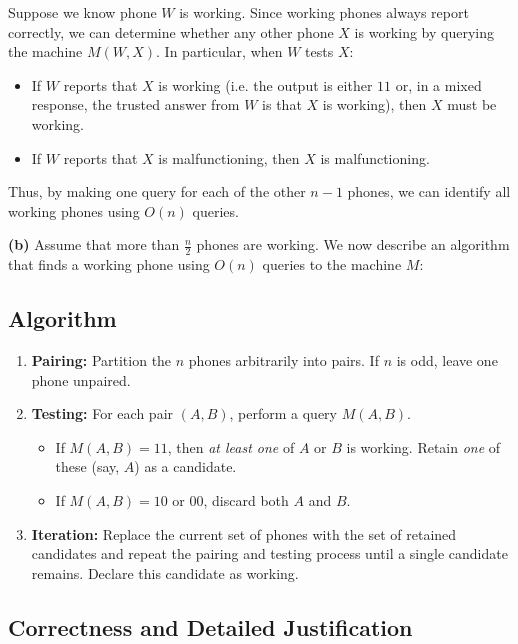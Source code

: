 \documentclass[11pt]{article}
\begin{document}
    Suppose we know  phone \(W\) is working. Since working phones always report correctly, we can determine whether any other phone \(X\) is working by querying the machine \(M(W,X)\). In particular, when \(W\) tests \(X\):
    \begin{itemize}
        \item If \(W\) reports that \(X\) is working (i.e. the output is either \(11\) or, in a mixed response, the trusted answer from \(W\) is that \(X\) is working), then \(X\) must be working.
        \item If \(W\) reports that \(X\) is malfunctioning, then \(X\) is malfunctioning.
    \end{itemize}
    Thus, by making one query for each of the other \(n-1\) phones, we can identify all working phones using \(O(n)\) queries.
    
    \bigskip
    
    \textbf{(b) }
    Assume that more than $\frac{n}{2}$ phones are working. We now describe an algorithm that finds a working phone using $O(n)$ queries to the machine $M$:
    \subsection*{Algorithm}
    \begin{enumerate}
        \item \textbf{Pairing:} Partition the $n$ phones arbitrarily into pairs. If $n$ is odd, leave one phone unpaired.
        \item \textbf{Testing:} For each pair $(A,B)$, perform a query $M(A,B)$.
        \begin{itemize}
            \item If $M(A,B) = 11$, then \emph{at least one} of $A$ or $B$ is working. Retain \emph{one} of these (say, $A$) as a candidate.
            \item If $M(A,B) = 10$ or $00$, discard both $A$ and $B$.
        \end{itemize}
        \item \textbf{Iteration:} Replace the current set of phones with the set of retained candidates and repeat the pairing and testing process until a single candidate remains. Declare this candidate as working.
    \end{enumerate}
    
    \subsection*{Correctness and Detailed Justification}
    
\end{document}
